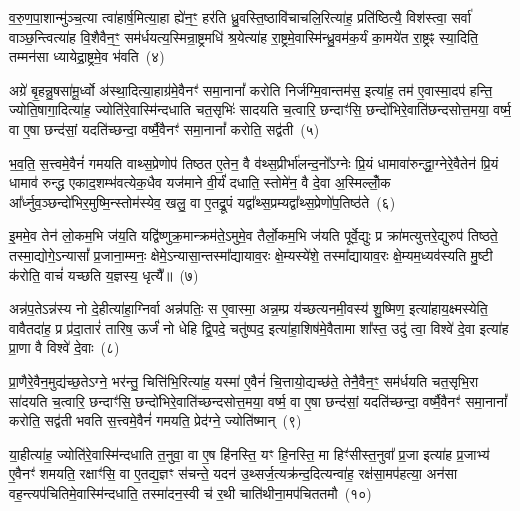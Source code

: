 व॒रु॒ण॒पा॒शान्मु॑ञ्च॒त्या त्वा॑हार्\mbox{}ष॒मित्या॒हा ह्ये॑न॒ꣳ॒ हर॑ति ध्रु॒वस्ति॒ष्ठावि॑चाचलि॒रित्या॑ह॒ प्रति॑ष्ठित्यै॒ विश॑स्त्वा॒ सर्वा॑ वाञ्छ॒न्त्वित्या॑ह वि॒शैवैन॒ꣳ॒ सम॑र्धयत्य॒स्मिन्रा॒ष्ट्रमधि॑ श्र॒येत्या॑ह रा॒ष्ट्रमे॒वास्मि॑न्ध्रु॒वम॑क॒र्यं का॒मये॑त रा॒ष्ट्रꣴ स्या॒दिति॒ तम्मन॑सा ध्यायेद्रा॒ष्ट्रमे॒व भ॑वति~(४)

अग्रे॑ बृ॒हन्नु॒षसा॑मू॒र्ध्वो अ॑स्था॒दित्या॒हाग्र॑मे॒वैनꣳ॑ समा॒नानां᳚ करोति निर्जग्मि॒वान्तम॑स॒ इत्या॑ह॒ तम॑ ए॒वास्मा॒दप॑ हन्ति॒ ज्योति॒षागा॒दित्या॑ह॒ ज्योति॑रे॒वास्मि॑न्दधाति चत॒सृभिः॑ सादयति च॒त्वारि॒ छन्दाꣳ॑सि॒ छन्दो॑भिरे॒वाति॑छन्दसोत्त॒मया॒ वर्ष्म॒ वा ए॒षा छन्द॑सां॒ यदति॑च्छन्दा॒ वर्ष्मै॒वैनꣳ॑ समा॒नानां᳚ करोति॒ सद्व॑ती~(५)

भ॒व॒ति॒ स॒त्त्वमे॒वैनं॑ गमयति वाथ्स॒प्रेणोप॑ तिष्ठत ए॒तेन॒ वै व॑थ्स॒प्रीर्भा॑लन्द॒नो᳚\-ऽग्नेः प्रि॒यं धामावा॑रुन्द्धा॒ग्नेरे॒वैतेन॑ प्रि॒यं धामाव॑ रुन्द्ध एकाद॒शम्भ॑वत्येक॒धैव यज॑माने वी॒र्यं॑ दधाति॒ स्तोमे॑न॒ वै दे॒वा अ॒स्मिल्लोँ॒क आ᳚र्ध्नुव॒ञ्छन्दो॑भिर॒मुष्मि॒न्स्तोम॑स्येव॒ खलु॒ वा ए॒तद्रू॒पं यद्वा᳚थ्स॒प्रम्यद्वा᳚थ्स॒प्रेणो॑प॒तिष्ठ॑ते~(६)

इ॒ममे॒व तेन॑ लो॒कम॒भि ज॑य॒ति यद्वि॑ष्णुक्र॒मान्क्रम॑ते॒\-ऽमुमे॒व तैर्लो॒कम॒भि ज॑यति पूर्वे॒द्युः प्र क्रा॑मत्युत्तरे॒द्युरुप॑ तिष्ठते॒ तस्मा॒द्योगे॒\-ऽन्यासां᳚ प्र॒जाना॒म्मनः॒ क्षेमे॒\-ऽन्यासा॒न्तस्मा᳚द्यायाव॒रः क्षे॒म्यस्ये॑शे॒ तस्मा᳚द्यायाव॒रः क्षे॒म्यम॒ध्यव॑स्यति मु॒ष्टी क॑रोति॒ वाचं॑ यच्छति य॒ज्ञस्य॒ धृत्यै᳚॥~(७)

{}%

अन्न॑प॒ते\-ऽन्न॑स्य नो दे॒हीत्या॑हा॒ग्निर्वा अन्न॑पतिः॒ स ए॒वास्मा॒ अन्न॒म्प्र य॑च्छत्यनमी॒वस्य॑ शु॒ष्मिण॒ इत्या॑हाय॒क्ष्मस्येति॒ वावैतदा॑ह॒ प्र प्र॑दा॒तारं॑ तारिष॒ ऊर्जं॑ नो धेहि द्वि॒पदे॒ चतु॑ष्पद॒ इत्या॑हा॒शिष॑मे॒वैतामा शा᳚स्त॒ उदु॑ त्वा॒ विश्वे॑ दे॒वा इत्या॑ह प्रा॒णा वै विश्वे॑ दे॒वाः~(८)

प्रा॒णैरे॒वैन॒मुद्य॑च्छ॒ते\-ऽग्ने॒ भर॑न्तु॒ चित्ति॑भि॒रित्या॑ह॒ यस्मा॑ ए॒वैनं॑ चि॒त्तायो॒द्यच्छ॑ते॒ तेनै॒वैन॒ꣳ॒ सम॑र्धयति चत॒सृभि॒रा सा॑दयति च॒त्वारि॒ छन्दाꣳ॑सि॒ छन्दो॑भिरे॒वाति॑च्छन्दसोत्त॒मया॒ वर्ष्म॒ वा ए॒षा छन्द॑सां॒ यदति॑च्छन्दा॒ वर्ष्मै॒वैनꣳ॑ समा॒नानां᳚ करोति॒ सद्व॑ती भवति स॒त्त्वमे॒वैनं॑ गमयति॒ प्रेद॑ग्ने॒ ज्योति॑ष्मान्~(९)

या॒हीत्या॑ह॒ ज्योति॑रे॒वास्मि॑न्दधाति त॒नुवा॒ वा ए॒ष हि॑नस्ति॒ यꣳ हि॒नस्ति॒ मा हिꣳ॑सीस्त॒नुवा᳚ प्र॒जा इत्या॑ह प्र॒जाभ्य॑ ए॒वैनꣳ॑ शमयति॒ रक्षाꣳ॑सि॒ वा ए॒तद्य॒ज्ञꣳ स॑चन्ते॒ यदन॑ उ॒थ्सर्ज॒त्यक्र॑न्द॒दित्यन्वा॑ह॒ रक्ष॑सा॒मप॑हत्या॒ अन॑सा वह॒न्त्यप॑चितिमे॒वास्मि॑न्दधाति॒ तस्मा॑दन॒स्वी च॑ र॒थी चाति॑थीना॒मप॑चिततमौ~(१०)

